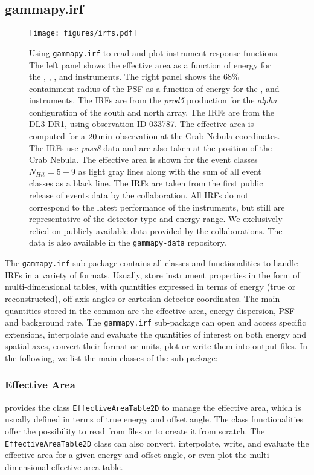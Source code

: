 \documentclass[longauth]{aa}
\newcommand{\code}[1]{\texttt{#1}}
\begin{document}
\subsection{gammapy.irf}
\label{ssec:gammapy-irf}
%
%
\begin{figure*}[t]
	\centering
	\texttt{[image: figures/irfs.pdf]}
	\caption{
		Using \code{gammapy.irf} to read and plot instrument response functions.
		The left panel shows the effective area as a function of energy for
		the \cta, \hess, \magic, \hawc and \fermi instruments. The right panel shows
		the $68\%$ containment radius of the PSF as a function of energy for the \cta, \hess
		and \fermi instruments. The \cta IRFs are from the \textit{prod5} production for the {\it alpha} configuration of the south and north array. The \hess IRFs are from the DL3 DR1,
        using observation ID 033787. The \magic effective area is computed for a
        $20\,{\rm min}$ observation at the Crab Nebula coordinates. The
		\fermi IRFs use \textit{pass8} data and are also taken at the position of the Crab Nebula.
		The \hawc effective area is shown for the event classes $N_{Hit}=5 - 9$ as light gray
		lines along with the sum of all event classes as a black line. The \hawc IRFs are taken from
		the first public release of events data by the \hawc collaboration. All IRFs do not correspond
		to the latest performance of the instruments, but still are representative of the 
		detector type and energy range. We exclusively relied on publicly available
		data provided by the collaborations. The data is also available in the
		\code{gammapy-data} repository.
    }
	\label{fig:irfs}
\end{figure*}
%

The \code{gammapy.irf} sub-package contains all classes and functionalities
to handle IRFs in a variety of formats.
Usually, \irfs store instrument properties in the form of multi-dimensional
tables, with quantities expressed in terms of energy (true or reconstructed),
off-axis angles or cartesian detector coordinates. The main quantities stored in
the common \gammaray \irfs are the effective area, energy dispersion,
PSF and background rate. The \code{gammapy.irf}
sub-package can open and access specific \irf extensions,
interpolate and evaluate the quantities of interest on both energy and spatial
axes, convert their format or units, plot or write them into
output files. In the following, we list the main classes of the
sub-package:

\subsubsection{Effective Area}
\gammapy provides the class \code{EffectiveAreaTable2D} to
manage the effective area, which is usually defined in terms of true energy and offset angle.
The class functionalities offer the possibility to read from files or to create
it from scratch. The \code{EffectiveAreaTable2D} class can also convert, interpolate,
write, and evaluate the effective area for a given energy and offset angle, or
even plot the multi-dimensional effective area table.
\end{document}
